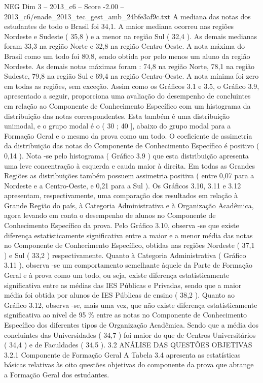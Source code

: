 \begin{textsample}{NEG Dim 3 – 2013\_c6 – Score -2.00 – 2013\_c6/enade\_2013\_tec\_gest\_amb\_24bfe3af9c.txt}
A mediana das notas dos estudantes de todo o Brasil foi 34,1.
A maior mediana ocorreu nas regiões Nordeste e Sudeste ( 35,8 ) e a menor na região Sul ( 32,4 ).
As demais medianas foram 33,3 na região Norte e 32,8 na região Centro-Oeste.
A nota máxima do Brasil como um todo foi 80,8, sendo obtida por pelo menos um aluno da região Nordeste.
As demais notas máximas foram : 74,8 na região Norte, 78,1 na região Sudeste, 79,8 na região Sul e 69,4 na região Centro-Oeste.
A nota mínima foi zero em todas as regiões, sem exceção.
Assim como os Gráficos 3.1 e 3.5, o Gráfico 3.9, apresentado a seguir, proporciona uma avaliação do desempenho de concluintes em relação ao Componente de Conhecimento Específico com um histograma da distribuição das notas correspondentes.
Esta também é uma distribuição unimodal, e o grupo modal é o ( 30 ; 40 ], abaixo do grupo modal para a Formação Geral e o mesmo da prova como um todo.
O coeficiente de assimetria da distribuição das notas do Componente de Conhecimento Específico é positivo ( 0,14 ).
Nota -se pelo histograma ( Gráfico 3.9 ) que esta distribuição apresenta uma leve concentração à esquerda e cauda maior à direita.
Em todas as Grandes Regiões as distribuições também possuem assimetria positiva ( entre 0,07 para a Nordeste e a Centro-Oeste, e 0,21 para a Sul ).
Os Gráficos 3.10, 3.11 e 3.12 apresentam, respectivamente, uma comparação dos resultados em relação à Grande Região do país, à Categoria Administrativa e à Organização Acadêmica, agora levando em conta o desempenho de alunos no Componente de Conhecimento Específico da prova.
Pelo Gráfico 3.10, observa -se que existe diferença estatisticamente significativa entre a maior e a menor média das notas no Componente de Conhecimento Específico, obtidas nas regiões Nordeste ( 37,1 ) e Sul ( 33,2 ) respectivamente.
Quanto à Categoria Administrativa ( Gráfico 3.11 ), observa -se um comportamento semelhante àquele da Parte de Formação Geral e à prova como um todo, ou seja, existe diferença estatisticamente significativa entre as médias das IES Públicas e Privadas, sendo que a maior média foi obtida por alunos de IES Públicas de ensino ( 38,2 ).
Quanto ao Gráfico 3.12, observa -se, mais uma vez, que não existe diferença estatisticamente significativa ao nível de 95 \% entre as notas no Componente de Conhecimento Específico dos diferentes tipos de Organização Acadêmica.
Sendo que a média dos concluintes das Universidades ( 34,7 ) foi maior do que de Centros Universitários ( 34,4 ) e de Faculdades ( 34,5 ). 3.2 ANÁLISE DAS QUESTÕES OBJETIVAS 3.2.1 Componente de Formação Geral A Tabela 3.4 apresenta as estatísticas básicas relativas às oito questões objetivas do componente da prova que abrange a Formação Geral dos estudantes.

\end{textsample}
